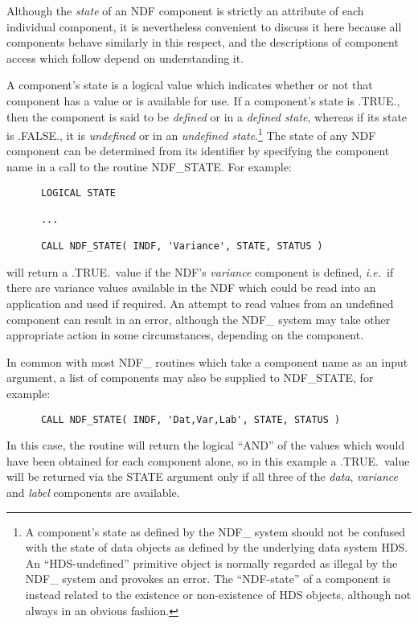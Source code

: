 \documentclass[twoside,11pt]{article}
\newcommand{\htmlref}[2]{#1}
\newcommand{\xref}[3]{#1}
\newcommand{\st}[1]{{\em{#1}}}
\begin{document}
Although the \st{state\/} of an NDF component is strictly an attribute of
each individual component, it is nevertheless convenient to discuss it here
because all components behave similarly in this respect, and the
descriptions of component access which follow depend on understanding it. 

A component's state is a logical value which indicates whether or not that 
component has a value or is available for use.
If a component's state is .TRUE., then the component is said to be
\st{defined\/} or in a \st{defined state}, whereas if its state is
.FALSE., it is 
\st{undefined\/} or in an \st{undefined state}.\footnote{A
component's state as defined by the NDF\_ system should not be
confused with the \xref{state of data objects}{sun92}{HDS_objects} as
defined by the underlying data system \xref{HDS}{sun92}{}. An
``HDS-undefined'' primitive object is normally regarded as illegal by
the NDF\_ system and provokes an error.
The ``NDF-state'' of a component is instead related to the existence
or non-existence of HDS objects, although not always in an obvious
fashion.}
The state of any NDF component can be determined from its identifier by 
specifying the component name in a call to the routine \htmlref{NDF\_STATE}{NDF_STATE}.
For example:

\small
\begin{verbatim}
      LOGICAL STATE

      ...

      CALL NDF_STATE( INDF, 'Variance', STATE, STATUS )
\end{verbatim}
\normalsize

will return a .TRUE.\ value if the NDF's \st{variance\/} component is defined,
\st{i.e.}\ if there are variance values available in the NDF which could be read
into an application and used if required. 
An attempt to read values from an undefined component can result in an
error, although the NDF\_ system may take other appropriate action in some
circumstances, depending on the component. 

In common with most NDF\_ routines which take a component name as an input
argument, a list of components may also be supplied to NDF\_STATE, for
example: 

\small
\begin{verbatim}
      CALL NDF_STATE( INDF, 'Dat,Var,Lab', STATE, STATUS )
\end{verbatim}
\normalsize

In this case, the routine will return the logical ``AND'' of the values
which would have been obtained for each component alone, so in this example
a .TRUE.\ value will be returned via the STATE argument only if all three of
the \st{data}, \st{variance\/} and \st{label\/} components are available. 
\end{document}
